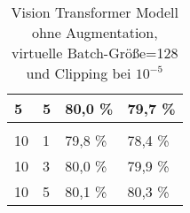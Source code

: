 \begin{table}[!ht]
\begin{tabular}{|llll|}
\multicolumn{1}{|l|}{5}                               & \multicolumn{1}{l|}{5}                                                                                & \multicolumn{1}{l|}{80,0 \%}                              & 79,7 \%            \\ \hline
\multicolumn{1}{|l|}{}                                & \multicolumn{1}{l|}{}                                                                                 & \multicolumn{1}{l|}{}                                     &                    \\ \hline
\multicolumn{1}{|l|}{10}                              & \multicolumn{1}{l|}{1}                                                                                & \multicolumn{1}{l|}{79,8 \%}                              & 78,4 \%            \\ \hline
\multicolumn{1}{|l|}{10}                              & \multicolumn{1}{l|}{3}                                                                                & \multicolumn{1}{l|}{80,0 \%}                              & 79,9 \%            \\ \hline
\multicolumn{1}{|l|}{10}                              & \multicolumn{1}{l|}{5}                                                                                & \multicolumn{1}{l|}{80,1 \%}                              & 80,3 \%            \\ \hline
\end{tabular}
\caption{Vision Transformer Modell ohne Augmentation, virtuelle Batch-Größe=128 und Clipping bei $10^{-5}$}
\label{tab:vit_dpsgd3}
\end{table}